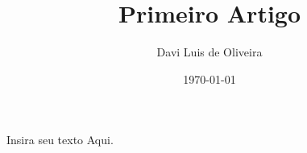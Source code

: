 \documentclass{article}
\title{Primeiro Artigo}
\author{Davi Luis de Oliveira}
\date{\today}
\begin{document}
\maketitle
Insira seu texto Aqui.
\end{document}
